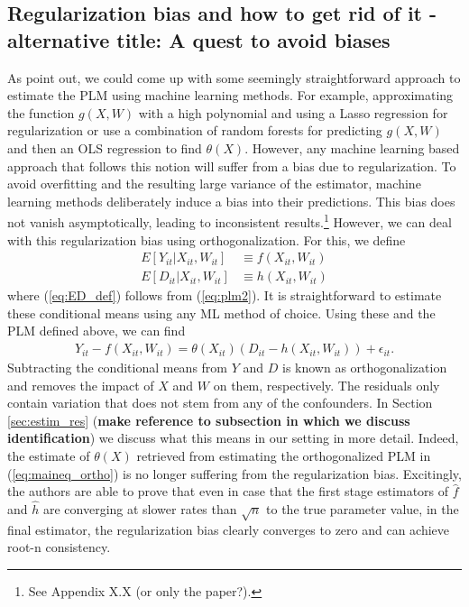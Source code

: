 \subsection{Regularization bias and how to get rid of it - alternative title: A quest to avoid biases}
As \cite{DML2017} point out, we could come up with some seemingly straightforward approach to estimate the PLM using machine learning methods. For example, approximating the function $g(X, W)$ with a high polynomial and using a Lasso regression for regularization or use a combination of random forests for predicting $g(X, W)$ and then an OLS regression to find $\theta(X)$. However, any machine learning based approach that follows this notion will suffer from a bias due to regularization. To avoid overfitting and the resulting large variance of the estimator, machine learning methods deliberately induce a bias into their predictions. This bias does not vanish asymptotically, leading to inconsistent results.\footnote{See Appendix X.X (or only the paper?).} However, we can deal with this regularization bias using orthogonalization. For this, we define 
\begin{align}
    E[Y_{it}|X_{it}, W_{it}] &\equiv f(X_{it}, W_{it}) \label{eq:EY_def}\\ 
    E[D_{it}|X_{it}, W_{it}] &\equiv h(X_{it}, W_{it}) \label{eq:ED_def}
\end{align}
where (\ref{eq:ED_def}) follows from (\ref{eq:plm2}). It is straightforward to estimate these conditional means using any ML method of choice. Using these and the PLM defined above, we can find 
\begin{align}
    Y_{it}-f(X_{it}, W_{it})=\theta(X_{it})(D_{it}-h(X_{it}, W_{it})) + \epsilon_{it}. \label{eq:maineq_ortho}
\end{align}
Subtracting the conditional means from $Y$ and $D$ is known as orthogonalization and removes the impact of $X$ and $W$ on them, respectively. The residuals only contain variation that does not stem from any of the confounders. In Section \ref{sec:estim_res} (\textbf{make reference to subsection in which we discuss identification}) we discuss what this means in our setting in more detail. Indeed, the estimate of $\theta(X)$ retrieved from  estimating the orthogonalized PLM in (\ref{eq:maineq_ortho}) is no longer suffering from the regularization bias. Excitingly, the authors are able to prove that even in case that the first stage estimators of $\hat{f}$ and $\hat{h}$ are converging at slower rates than $\sqrt{n}$ to the true parameter value, in the final estimator, the regularization bias clearly converges to zero and can achieve root-n consistency. \\
